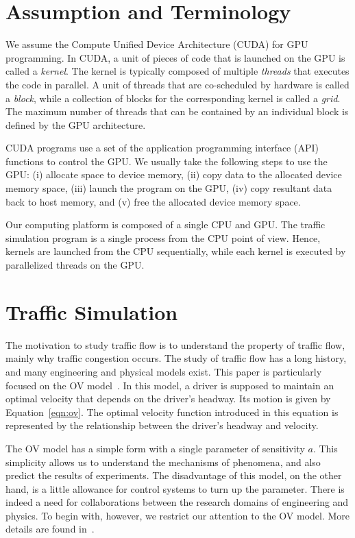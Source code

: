 \documentclass[times, 10pt, twocolumn]{article}
\begin{document}
\section{Assumption and Terminology}
\label{sec:assumption}

We assume the Compute Unified Device Architecture (CUDA) for GPU
programming.
In CUDA, a unit of pieces of code that is launched on the GPU is called
a \textit{kernel}.
The kernel is typically composed of multiple \textit{threads} that
executes the code in parallel.
A unit of threads that are co-scheduled by hardware is called a
\textit{block}, while a collection of blocks for the corresponding
kernel is called a \textit{grid}.  
The maximum number of threads that can be contained by an individual
block is defined by the GPU architecture.

CUDA programs use a set of the application programming interface (API)
functions to control the GPU.
We usually take the following steps to use the GPU: (i) allocate space
to device memory, (ii) copy data to the allocated device memory space,
(iii) launch the program on the GPU, (iv) copy resultant data back to
host memory, and (v) free the allocated device memory space. 

Our computing platform is composed of a single CPU and GPU.
The traffic simulation program is a single process from the CPU point of
view.
Hence, kernels are launched from the CPU sequentially, while each kernel
is executed by parallelized threads on the GPU.

\section{Traffic Simulation}
\label{sec:traffic_simulation}

The motivation to study traffic flow is to understand the property of
traffic flow, mainly why traffic congestion occurs.
The study of traffic flow has a long history, and many engineering and
physical models exist.
This paper is particularly focused on the OV model~\cite{Bando1995}.
In this model, a driver is supposed to maintain an optimal velocity that
depends on the driver's headway.
Its motion is given by Equation~\eqref{eqn:ov}.
The optimal velocity function introduced in this equation is represented
by the relationship between the driver's headway and velocity.

The OV model has a simple form with a single parameter of sensitivity
$a$.
This simplicity allows us to understand the mechanisms of phenomena, and
also predict the results of experiments.
The disadvantage of this model, on the other hand, is a little allowance
for control systems to turn up the parameter.
There is indeed a need for collaborations between the research domains
of engineering and physics.
To begin with, however, we restrict our attention to the OV model.
More details are found in~\cite{Bando1995}.
\end{document}
